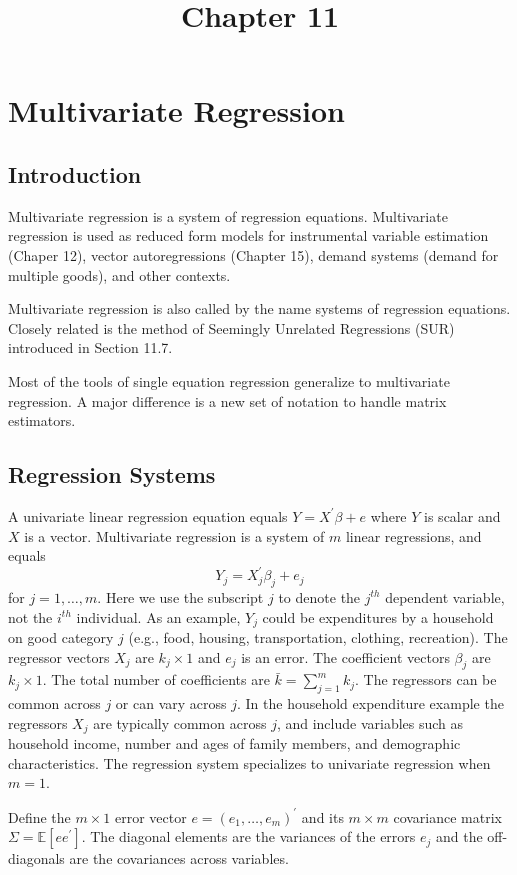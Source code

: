 \documentclass[10pt]{article}
\title{Chapter 11 }
\author{}
\date{}
\begin{document}
\maketitle
\section{Multivariate Regression}
\subsection{Introduction}
Multivariate regression is a system of regression equations. Multivariate regression is used as reduced form models for instrumental variable estimation (Chaper 12), vector autoregressions (Chapter 15), demand systems (demand for multiple goods), and other contexts.

Multivariate regression is also called by the name systems of regression equations. Closely related is the method of Seemingly Unrelated Regressions (SUR) introduced in Section 11.7.

Most of the tools of single equation regression generalize to multivariate regression. A major difference is a new set of notation to handle matrix estimators.

\subsection{Regression Systems}
A univariate linear regression equation equals $Y=X^{\prime} \beta+e$ where $Y$ is scalar and $X$ is a vector. Multivariate regression is a system of $m$ linear regressions, and equals
$$
Y_{j}=X_{j}^{\prime} \beta_{j}+e_{j}
$$
for $j=1, \ldots, m$. Here we use the subscript $j$ to denote the $j^{t h}$ dependent variable, not the $i^{t h}$ individual. As an example, $Y_{j}$ could be expenditures by a household on good category $j$ (e.g., food, housing, transportation, clothing, recreation). The regressor vectors $X_{j}$ are $k_{j} \times 1$ and $e_{j}$ is an error. The coefficient vectors $\beta_{j}$ are $k_{j} \times 1$. The total number of coefficients are $\bar{k}=\sum_{j=1}^{m} k_{j}$. The regressors can be common across $j$ or can vary across $j$. In the household expenditure example the regressors $X_{j}$ are typically common across $j$, and include variables such as household income, number and ages of family members, and demographic characteristics. The regression system specializes to univariate regression when $m=1$.

Define the $m \times 1$ error vector $e=\left(e_{1}, \ldots, e_{m}\right)^{\prime}$ and its $m \times m$ covariance matrix $\Sigma=\mathbb{E}\left[e e^{\prime}\right]$. The diagonal elements are the variances of the errors $e_{j}$ and the off-diagonals are the covariances across variables.
\end{document}
